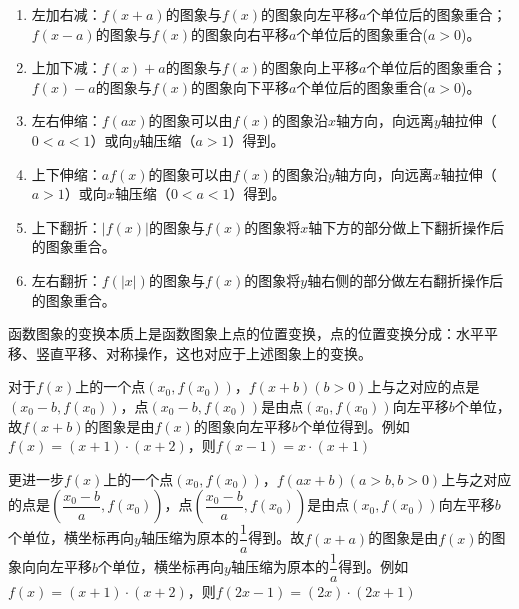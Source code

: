 \begin{enumerate}
    \item 左加右减：$f(x+a)$的图象与$f(x)$的图象向左平移$a$个单位后的图象重合；$f(x-a)$的图象与$f(x)$的图象向右平移$a$个单位后的图象重合($a > 0$)。
    \item 上加下减：$f(x)+a$的图象与$f(x)$的图象向上平移$a$个单位后的图象重合；$f(x)-a$的图象与$f(x)$的图象向下平移$a$个单位后的图象重合($a > 0$)。
    \item 左右伸缩：$f(ax)$的图象可以由$f(x)$的图象沿$x$轴方向，向远离$y$轴拉伸（$0 < a < 1$）或向$y$轴压缩（$a > 1$）得到。
    \item 上下伸缩：$af(x)$的图象可以由$f(x)$的图象沿$y$轴方向，向远离$x$轴拉伸（$a > 1$）或向$x$轴压缩（$0 < a < 1$）得到。
    \item 上下翻折：$|f(x)|$的图象与$f(x)$的图象将$x$轴下方的部分做上下翻折操作后的图象重合。
    \item 左右翻折：$f(|x|)$的图象与$f(x)$的图象将$y$轴右侧的部分做左右翻折操作后的图象重合。
\end{enumerate}

函数图象的变换本质上是函数图象上点的位置变换，点的位置变换分成：水平平移、竖直平移、对称操作，这也对应于上述图象上的变换。
\par 对于$f(x)$上的一个点$(x_0, f(x_0))$，$f(x+b) (b>0)$上与之对应的点是$(x_0-b, f(x_0))$，点$(x_0-b, f(x_0))$是由点$(x_0, f(x_0))$向左平移$b$个单位，故$f(x+b)$的图象是由$f(x)$的图象向左平移$b$个单位得到。例如$f(x) = (x+1)\cdot(x+2)$，则$f(x-1) = x\cdot(x+1)$
\par 更进一步$f(x)$上的一个点$(x_0, f(x_0))$，$f(ax+b)(a > b, b > 0)$上与之对应的点是$\left(\dfrac{x_0-b}{a}, f(x_0)\right)$，点$\left(\dfrac{x_0-b}{a}, f(x_0)\right)$是由点$(x_0, f(x_0))$向左平移$b$个单位，横坐标再向$y$轴压缩为原本的$\dfrac{1}{a}$得到。故$f(x+a)$的图象是由$f(x)$的图象向向左平移$b$个单位，横坐标再向$y$轴压缩为原本的$\dfrac{1}{a}$得到。例如$f(x) = (x+1) \cdot (x+2)$，则$f(2x-1) = (2x)\cdot(2x+1)$ \\

